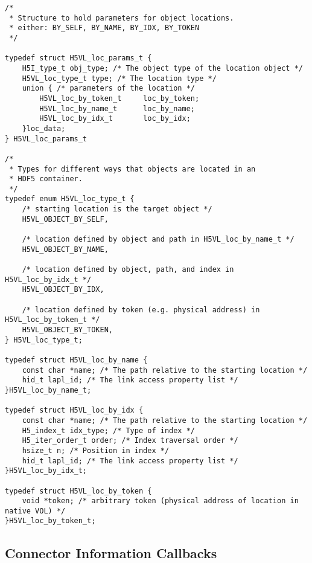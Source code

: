 \begin{lstlisting}[caption={Structure to hold parameters for object locations, H5VLconnector.h}, captionpos=b, label={lst:ObjLocclass}]
/* 
 * Structure to hold parameters for object locations.
 * either: BY_SELF, BY_NAME, BY_IDX, BY_TOKEN
 */

typedef struct H5VL_loc_params_t {
    H5I_type_t obj_type; /* The object type of the location object */
    H5VL_loc_type_t type; /* The location type */
    union { /* parameters of the location */
        H5VL_loc_by_token_t     loc_by_token;                                    
        H5VL_loc_by_name_t      loc_by_name;                                     
        H5VL_loc_by_idx_t       loc_by_idx;  
    }loc_data;
} H5VL_loc_params_t

/* 
 * Types for different ways that objects are located in an 
 * HDF5 container.
 */
typedef enum H5VL_loc_type_t {
    /* starting location is the target object */
    H5VL_OBJECT_BY_SELF, 

    /* location defined by object and path in H5VL_loc_by_name_t */
    H5VL_OBJECT_BY_NAME, 

    /* location defined by object, path, and index in H5VL_loc_by_idx_t */
    H5VL_OBJECT_BY_IDX,

    /* location defined by token (e.g. physical address) in H5VL_loc_by_token_t */
    H5VL_OBJECT_BY_TOKEN,
} H5VL_loc_type_t;

typedef struct H5VL_loc_by_name {
    const char *name; /* The path relative to the starting location */
    hid_t lapl_id; /* The link access property list */
}H5VL_loc_by_name_t;

typedef struct H5VL_loc_by_idx {
    const char *name; /* The path relative to the starting location */
    H5_index_t idx_type; /* Type of index */
    H5_iter_order_t order; /* Index traversal order */
    hsize_t n; /* Position in index */
    hid_t lapl_id; /* The link access property list */
}H5VL_loc_by_idx_t;

typedef struct H5VL_loc_by_token {
    void *token; /* arbitrary token (physical address of location in native VOL) */
}H5VL_loc_by_token_t;
\end{lstlisting}


\subsection{Connector Information Callbacks}

